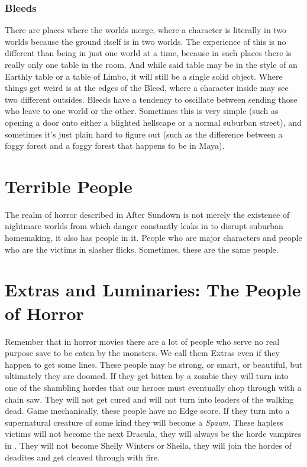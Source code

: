 \subsubsection{Bleeds} 
\hspace{\parindent} There are places where the worlds merge, where a character is literally in two worlds because the ground itself is in two worlds. The experience of this is no different than being in just one world at a time, because in such places there is really only one table in the room. And while said table may be in the style of an Earthly table or a table of Limbo, it will still be a single solid object. Where things get weird is at the edges of the Bleed, where a character inside may see two different outsides. Bleeds have a tendency to oscillate between sending those who leave to one world or the other. Sometimes this is very simple (such as opening a door onto either a blighted hellscape or a normal suburban street), and sometimes it's just plain hard to figure out (such as the difference between a foggy forest and a foggy forest that happens to be in Maya). 

\section{Terrible People}

The realm of horror described in After Sundown is not merely the existence of nightmare worlds from which danger constantly leaks in to disrupt suburban homemaking, it also has people in it. People who are major characters and people who are the victims in slasher flicks. Sometimes, these are the same people.

\section[Extras and Luminaries]{Extras and Luminaries: The People of Horror}

Remember that in horror movies there are a lot of people who serve no real purpose save to be eaten by the monsters. We call them Extras even if they happen to get some lines. These people may be strong, or smart, or beautiful, but ultimately they are doomed. If they get bitten by a zombie they will turn into one of the shambling hordes that our heroes must eventually chop through with a chain saw. They will not get cured and will not turn into leaders of the walking dead. Game mechanically, these people have no Edge score. If they turn into a supernatural creature of some kind they will become a \textit{Spawn}. These hapless victims will not become the next Dracula, they will always be the horde vampires in . They will not become Shelly Winters or Sheila, they will join the hordes of deadites and get cleaved through with fire.


